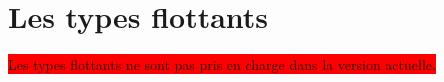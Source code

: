 




\chapter{Les types flottants}

\colorbox{red}{Les types flottants ne sont pas pris en charge dans la version actuelle.}